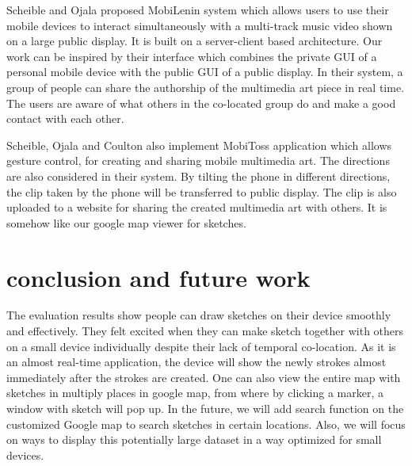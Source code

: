 \documentclass{chi2009}
\begin{document}
Scheible and Ojala \cite{mobilenin:scheible} proposed MobiLenin system which allows users to use their mobile devices to interact simultaneously with a multi-track music video shown on a large public display. It is built on a server-client based architecture. Our work can be inspired by their interface which combines the private GUI of a personal mobile device with the public GUI of a public display. In their system, a group of people can share the authorship of the multimedia art piece in real time. The users are aware of what others in the co-located group do and make a good contact with each other.

Scheible, Ojala and Coulton \cite{mobitoss:scheible} also implement MobiToss application which allows gesture control, for creating and sharing mobile multimedia art. The directions are also considered in their system. By tilting the phone in different directions, the clip taken by the phone will be transferred to public display. The clip is also uploaded to a website for sharing the created multimedia art with others. It is somehow like our google map viewer for sketches.

\section{conclusion and future work}

The evaluation results show people can draw sketches on their device smoothly
and effectively. They felt excited when they can make sketch together with
others on a small device individually despite their lack of temporal
co-location. As it is an almost real-time application, the device will show the
newly strokes almost immediately after the strokes are created. One can also
view the entire map with sketches in multiply places in google map, from where
by clicking a marker, a window with sketch will pop up. In the future, we will
add search function on the customized Google map to search sketches in certain
locations. Also, we will focus on ways to display this potentially large
dataset in a way optimized for small devices.





\newpage
\appendix

\end{document}
